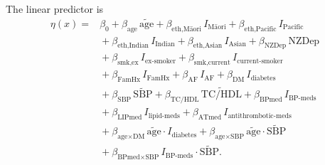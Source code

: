 \documentclass{article}
\begin{document}
The linear predictor is
\begin{align}
\eta(x) ={}&
\beta_0
+ \beta_{\text{age}} \,\tilde{\text{age}}
+ \beta_{\text{eth,M\={a}ori}} \, I_{\text{M\={a}ori}}
+ \beta_{\text{eth,Pacific}} \, I_{\text{Pacific}}
\nonumber\\
&{}
+ \beta_{\text{eth,Indian}} \, I_{\text{Indian}}
+ \beta_{\text{eth,Asian}} \, I_{\text{Asian}}
+ \beta_{\text{NZDep}} \,\text{NZDep}
\nonumber\\
&{}
+ \beta_{\text{smk,ex}} \, I_{\text{ex-smoker}}
+ \beta_{\text{smk,current}} \, I_{\text{current-smoker}}
\nonumber\\
&{}
+ \beta_{\text{FamHx}} \, I_{\text{FamHx}}
+ \beta_{\text{AF}} \, I_{\text{AF}}
+ \beta_{\text{DM}} \, I_{\text{diabetes}}
\nonumber\\
&{}
+ \beta_{\text{SBP}} \,\widetilde{\text{SBP}}
+ \beta_{\text{TC/HDL}} \,\widetilde{\text{TC/HDL}}
+ \beta_{\text{BPmed}} \, I_{\text{BP-meds}}
\nonumber\\
&{}
+ \beta_{\text{LIPmed}} \, I_{\text{lipid-meds}}
+ \beta_{\text{ATmed}} \, I_{\text{antithrombotic-meds}}
\nonumber\\
&{}
+ \beta_{\text{age}\times\text{DM}} \,\tilde{\text{age}} \cdot I_{\text{diabetes}}
+ \beta_{\text{age}\times\text{SBP}} \,\tilde{\text{age}} \cdot \widetilde{\text{SBP}}
\nonumber\\
&{}
+ \beta_{\text{BPmed}\times\text{SBP}} \, I_{\text{BP-meds}} \cdot \widetilde{\text{SBP}}.
\end{align}
\end{document}
